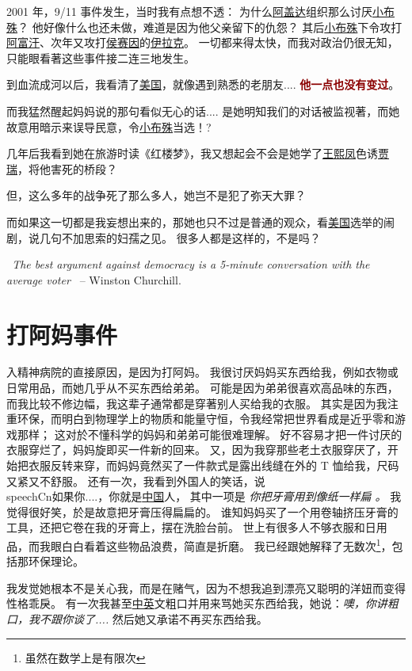 \documentclass[12pt]{report}
\newcommand{\speechEn}[1]{\textrm{\textit{\ #1\ }}}
\newcommand{\speechCn}[1]{\textrm{\textit{\textcolor{Speech}{#1}}}}
\renewcommand{\em}[1]{\textbf{\textcolor{DarkRed}{#1}}}
\begin{document}
2001 年，9/11 事件发生，当时我有点想不透： 为什么\uline{阿盖达}组织那么讨厌\uline{小布殊}？ 他好像什么也还未做，难道是因为他父亲留下的仇怨？ 其后\uline{小布殊}下令攻打\uline{阿富汗}、次年又攻打\uline{侯赛因}的\uline{伊拉克}。 一切都来得太快，而我对政治仍很无知，只能眼看著这些事件接二连三地发生。

到血流成河以后，我看清了\uline{美国}，就像遇到熟悉的老朋友.... \em{他一点也没有变过}。

而我猛然醒起妈妈说的那句看似无心的话.... 是她明知我们的对话被监视著，而她故意用暗示来误导民意，令\uline{小布殊}当选！?

几年后我看到她在旅游时读《红楼梦》，我又想起会不会是她学了\uline{王熙凤}色诱\uline{贾瑞}，将他害死的桥段？

但，这么多年的战争死了那么多人，她岂不是犯了弥天大罪？

而如果这一切都是我妄想出来的，那她也只不过是普通的观众，看\uline{美国}选举的闹剧，说几句不加思索的妇孺之见。 很多人都是这样的，不是吗？

\speechEn{The best argument against democracy is a 5-minute conversation with the average voter} -- Winston Churchill.

\chapter{打阿妈事件}

入精神病院的直接原因，是因为打阿妈。 我很讨厌妈妈买东西给我，例如衣物或日常用品，而她几乎从不买东西给弟弟。 可能是因为弟弟很喜欢高品味的东西，而我比较不修边幅，我这辈子通常都是穿著别人买给我的衣服。 其实是因为我注重环保，而明白到物理学上的物质和能量守恒，令我经常把世界看成是近乎零和游戏那样； 这对於不懂科学的妈妈和弟弟可能很难理解。 好不容易才把一件讨厌的衣服穿烂了，妈妈旋即买一件新的回来。 又，因为我穿那些老土衣服穿厌了，开始把衣服反转来穿，而妈妈竟然买了一件款式是露出线缝在外的 T 恤给我，尺码又紧又不舒服。 还有一次，我看到外国人的笑话，说 \\speechCn{如果你....，你就是\uline{中国}人}， 其中一项是 \speechCn{你把牙膏用到像纸一样扁 。}  我觉得很好笑，於是故意把牙膏压得扁扁的。 谁知妈妈买了一个用卷轴挤压牙膏的工具，还把它卷在我的牙膏上，摆在洗脸台前。 世上有很多人不够衣服和日用品，而我眼白白看着这些物品浪费，简直是折磨。 我已经跟她解释了无数次\footnote{虽然在数学上是有限次}，包括那环保理论。

我发觉她根本不是关心我，而是在赌气，因为不想我追到漂亮又聪明的洋妞而变得性格乖戾。 有一次我甚至\uline{中英}文粗口并用来骂她买东西给我，她说：\speechCn{噢，你讲粗口，我不跟你谈了....} 然后她又承诺不再买东西给我。
\end{document}
